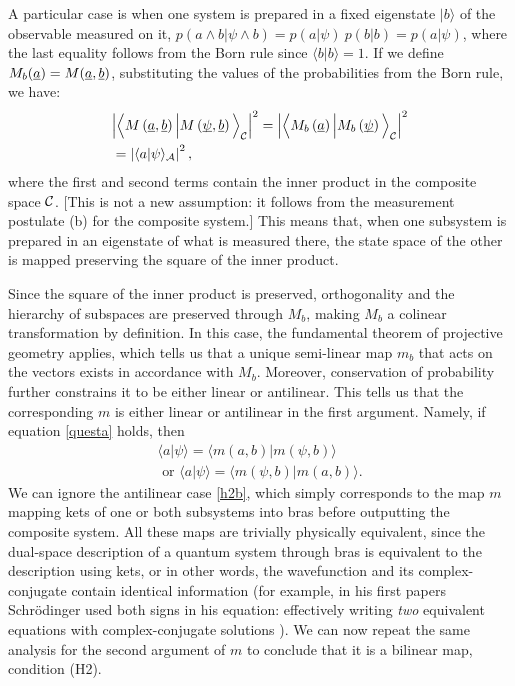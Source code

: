 \documentclass[aps,prl,amsmath,amssymb,twocolumn,nofootinbib]{revtex4}
\theoremstyle{plain}
\theoremstyle{definition}
\theoremstyle{remark}
\newcommand{\pj}[1] {\underbar{$#1$}}
\def\>{\rangle}
\def\<{\langle}
\def\labell#1{\label{#1}}
\begin{document}
A particular case is when one system is
prepared in a fixed eigenstate $|b\>$ of the observable measured on it,
$p(a\wedge b|\psi\wedge b)=p(a|\psi)\:p(b|b)=p(a|\psi)$, where the last equality follows from the Born rule since $\<b|b\>=1$. 
  If we define $M_b(\pj{a}) = M(\pj{a},\pj{b})$, substituting the values of the
probabilities from the Born rule, we have:
\begin{align} &\Big|\Big\<M\left(\pj{a},\pj{b}\right)\Big|M\left(\pj{\psi},\pj{b}\right)\Big\>_{\cal C}\Big|^2
  =\Big|\Big\<M_b\left(\pj{a}\right)\Big|M_b\left(\pj{\psi}\right)\Big\>_{\cal C}\Big|^2
\nonumber \\&
=\left|\<a|\psi\>_{\cal A}\right|^2
\labell{questa},
\end{align}
where the first and second terms contain the inner product in the composite
space $\cal C$. [This is not a new assumption: it follows from the
measurement postulate (b) for the composite system.] This means that,
when one subsystem is prepared in an eigenstate of what is measured
there, the state space of the other is mapped preserving the square of
the inner product.

Since the square of the inner product is preserved, orthogonality and
the hierarchy of subspaces are preserved through $M_b$, making $M_b$ a
colinear transformation by definition. In this case, the fundamental
theorem of projective geometry \cite{fun} applies, which tells us that
a unique semi-linear map $m_b$ that acts on the vectors exists in accordance with $M_b$.
Moreover, conservation of probability further constrains it to be
either linear or antilinear. This tells us that the corresponding $m$
is either linear or antilinear in the first argument. Namely, if equation
\eqref{questa} holds, then
\begin{align}
\<a|\psi\>=\<m(a,b)|m(\psi,b)\>\labell{h2}\;
 \\\mbox{ or }
\<a|\psi\>=\<m(\psi,b)|m(a,b)\> \labell{h2b}.
\end{align}
We can ignore the antilinear case \eqref{h2b}, which simply
corresponds to the map $m$ mapping kets of one or both subsystems into
bras before outputting the composite system. All these maps are
trivially physically equivalent, since the dual-space description of a
quantum system through bras is equivalent to the description using
kets, or in other words, the wavefunction and its complex-conjugate
contain identical information (for example, in his first papers
Schr\"odinger used both signs in his equation: effectively writing
{\em two} equivalent equations with complex-conjugate solutions
\cite{sch}). We can now repeat the same analysis for the second
argument of $m$ to conclude that it is a bilinear map, condition (H2).
\end{document}
